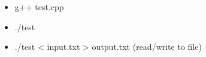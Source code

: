 \begin{itemize}
    \item g++ test.cpp
    \item ./test
    \item ./test < input.txt > output.txt (read/write to file)
\end{itemize}